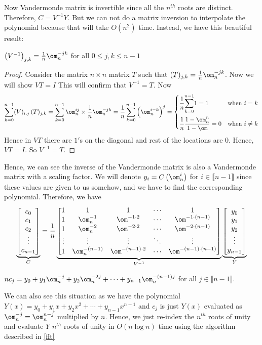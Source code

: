Now Vandermonde matrix is invertible since all the $n^{th}$ roots are distinct. Therefore, $C=V^{-1}Y$. But we can not do a matrix inversion to interpolate the polynomial because that will take $O(n^2)$ time. Instead, we have this beautiful result:
\begin{lemma}{}{}
	$\lt(V^{-1}\rt)_{j,k}=\frac1n\om_n^{-jk}$ for all $0\leq j,k\leq n-1$
\end{lemma}
\begin{proof}
	Consider the matrix $n\times n$ matrix $T$ such that $(T)_{j,k}=\frac1n\om_n^{-jk}$. Now we will show $VT=I$ This will confirm that $V^{-1}=T$. Now $$\sum_{k=0}^{n-1} (V)_{i,j}\, (T)_{j,k}=\sum_{k=0}^{n-1} \om^{ij}_n\times \frac1n\om_n^{-jk}=\frac1n\sum_{k=0}^{n-1}\lt(\om^{i-k}_n\rt)^j=\begin{cases}
			\dfrac1n\dps{\sum\limits_{k=0}^{n-1}}1=1 & \text{when $i=k$} \\[5mm] \dfrac1n \dfrac{1-\om^n_n}{1-\om} =0 & \text{when $i\neq k$}
		\end{cases} $$Hence in $VT$ there are $1'$s on the diagonal and rest of the locations are $0$. Hence, $VT=I$. So $V^{-1}=T$.
\end{proof}
Hence, we can see the inverse of the Vandermonde matrix is also a Vandermonde matrix with a scaling factor. We will denote $y_i=C\lt(\om_n^{i}\rt)$ for $i\in\llbracket n-1\rrbracket$ since these values are given to us somehow, and we have to find the corresponding polynomial. Therefore, we have $$\underbrace{\mat{c_0\\ c_1\\ c_2\\ \vdots \\ c_{n-1}}}_{C}=\frac1n\underbrace{\mat{1 & 1 & 1& \cdots & 1\\  1 & \om^{-1}_n & \om ^{-1\cdot 2}& \cdots & \om^{-1\cdot (n-1)}\\ 1 & \om^{-2}_n & \om ^{-2\cdot 2}& \cdots & \om^{-2\cdot (n-1)}\\ \vdots & \vdots & \vdots & \ddots & \vdots\\ 1 & \om^{-(n-1)}_n & \om ^{-(n-1)\cdot 2}& \cdots & \om^{-(n-1)\cdot (n-1)}}}_{V^{-1}}\underbrace{\mat{y_0\\ y_1\\ y_2\\ \vdots\\ y_{n-1}}}_{Y}$$
\begin{observation*}
	$nc_j=y_0+y_1\om_n^{-j}+y_2\om_n^{-2j}+\cdots+y_{n-1}\om_n^{-(n-1)j}$ for all $j\in\llbracket n-1\rrbracket$.
\end{observation*}
We can also see this situation as we have the polynomial $Y(x)=y_0+y_1x+y_2x^2+\cdots +y_{n-1}x^{n-1}$ and $c_j$ is just $Y(x)$ evaluated as $\om^{-j}_n=\om_n^{n-j}$ multiplied by $n$. Hence, we just re-index the $n^{th}$ roots of unity and evaluate $Y$ $n^{th}$ roots of unity in $O(n\log n)$ time using the algorithm described in \autoref{fft}